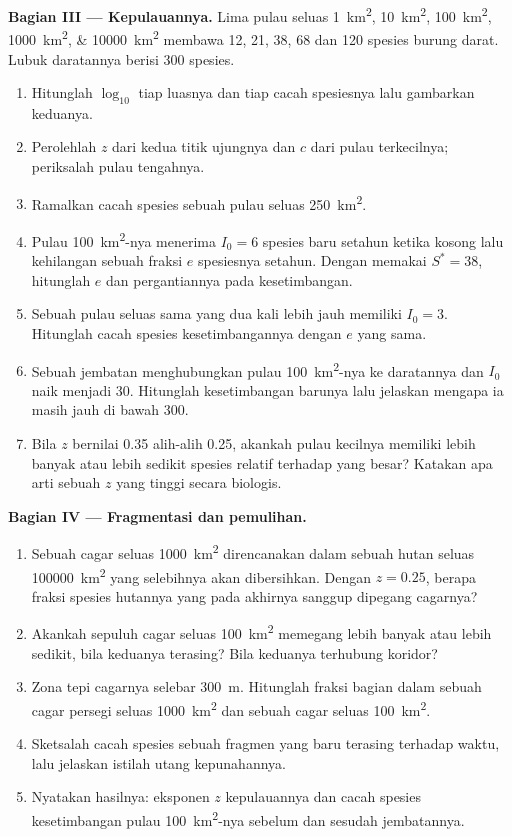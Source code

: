 \begin{problem}
\medskip
\noindent\textbf{Bagian III --- Kepulauannya.}
Lima pulau seluas \qtylist{1;10;100;1000;10000}{km^2} membawa \num{12}, \num{21}, \num{38}, \num{68} dan
\num{120} spesies burung darat. Lubuk daratannya berisi \num{300}
spesies.
\begin{enumerate}[resume]
  \item Hitunglah $\log_{10}$ tiap luasnya dan tiap cacah spesiesnya
        lalu gambarkan keduanya.
  \item Perolehlah $z$ dari kedua titik ujungnya dan $c$ dari pulau
        terkecilnya; periksalah pulau tengahnya.
  \item Ramalkan cacah spesies sebuah pulau seluas \qty{250}{km^2}.
  \item Pulau \qty{100}{km^2}-nya menerima $I_0 = 6$ spesies baru
        setahun ketika kosong lalu kehilangan sebuah fraksi $e$
        spesiesnya setahun. Dengan memakai $S^* = 38$, hitunglah $e$
        dan pergantiannya pada kesetimbangan.
  \item Sebuah pulau seluas sama yang dua kali lebih jauh memiliki
        $I_0 = 3$. Hitunglah cacah spesies kesetimbangannya dengan $e$
        yang sama.
  \item Sebuah jembatan menghubungkan pulau \qty{100}{km^2}-nya ke
        daratannya dan $I_0$ naik menjadi \num{30}. Hitunglah
        kesetimbangan barunya lalu jelaskan mengapa ia masih jauh di
        bawah \num{300}.
  \item Bila $z$ bernilai \num{0.35} alih-alih \num{0.25}, akankah
        pulau kecilnya memiliki lebih banyak atau lebih sedikit spesies
        relatif terhadap yang besar? Katakan apa arti sebuah $z$ yang
        tinggi secara biologis.
\end{enumerate}

\medskip
\noindent\textbf{Bagian IV --- Fragmentasi dan pemulihan.}
\begin{enumerate}[resume]
  \item Sebuah cagar seluas \qty{1000}{km^2} direncanakan dalam sebuah
        hutan seluas \qty{100000}{km^2} yang selebihnya akan
        dibersihkan. Dengan $z =
        0.25$, berapa fraksi spesies hutannya yang pada akhirnya
        sanggup dipegang cagarnya?
  \item Akankah sepuluh cagar seluas \qty{100}{km^2} memegang lebih
        banyak atau lebih sedikit, bila keduanya terasing? Bila
        keduanya terhubung koridor?
  \item Zona tepi cagarnya selebar \qty{300}{m}. Hitunglah fraksi
        bagian dalam sebuah cagar persegi seluas \qty{1000}{km^2} dan
        sebuah cagar seluas \qty{100}{km^2}.
  \item Sketsalah cacah spesies sebuah fragmen yang baru terasing
        terhadap waktu, lalu jelaskan istilah utang kepunahannya.
  \item Nyatakan hasilnya: eksponen $z$ kepulauannya dan cacah spesies
        kesetimbangan pulau \qty{100}{km^2}-nya sebelum dan sesudah
        jembatannya.
\end{enumerate}
\end{problem}
